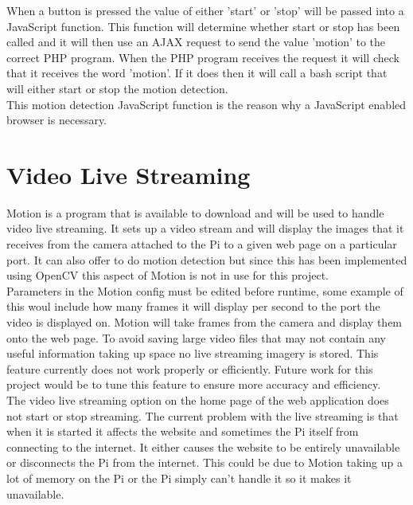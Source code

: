 \documentclass[12pt]{report}
\begin{document}
When a button is pressed the value of either 'start' or 'stop' will be passed into a JavaScript function. This function will determine whether start or stop has been called and it will then use an AJAX request to send the value 'motion' to the correct PHP program. When the PHP program receives the request it will check that it receives the word 'motion'. If it does then it will call a bash script that will either start or stop the motion detection.\\

This motion detection JavaScript function is the reason why a JavaScript enabled browser is necessary.\\


\section{Video Live Streaming}
\label{sec:video}

Motion is a program that is available to download and will be used to handle video live streaming. It sets up a video stream and will display the images that it receives from the camera attached to the Pi to a given web page on a particular port. It can also offer to do motion detection but since this has been implemented using OpenCV this aspect of Motion is not in use for this project.\\


Parameters in the Motion config must be edited before runtime, some example of this woul include how many frames it will display per second to the port the video is displayed on. Motion will take frames from the camera and display them onto the web page. To avoid saving large video files that may not contain any useful information taking up space no live streaming imagery is stored. This feature currently does not work properly or efficiently. Future work for this project would be to tune this feature to ensure more accuracy and efficiency.\\

The video live streaming option on the home page of the web application does not start or stop streaming. The current problem with the live streaming is that when it is started it affects the website and sometimes the Pi itself from connecting to the internet. It either causes the website to be entirely unavailable or disconnects the Pi from the internet. This could be due to Motion taking up a lot of memory on the Pi or the Pi simply can't handle it so it makes it unavailable. \\
\end{document}
